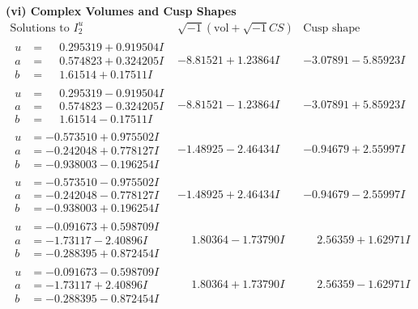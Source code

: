 \documentclass[1p]{elsarticle_modified}
\theoremstyle{definition}
\newcommand{\I}{\sqrt{-1}}
\begin{document}
\newpage\flushleft \textbf{(vi) Complex Volumes and Cusp Shapes}
$$\begin{array}{c|c|c}  
\text{Solutions to }I^u_{2}& \I (\text{vol} + \sqrt{-1}CS) & \text{Cusp shape}\\
 \hline 
\begin{aligned}
u &= \phantom{-}0.295319 + 0.919504 I \\
a &= \phantom{-}0.574823 + 0.324205 I \\
b &= \phantom{-}1.61514 + 0.17511 I\end{aligned}
 & -8.81521 + 1.23864 I & -3.07891 - 5.85923 I \\ \hline\begin{aligned}
u &= \phantom{-}0.295319 - 0.919504 I \\
a &= \phantom{-}0.574823 - 0.324205 I \\
b &= \phantom{-}1.61514 - 0.17511 I\end{aligned}
 & -8.81521 - 1.23864 I & -3.07891 + 5.85923 I \\ \hline\begin{aligned}
u &= -0.573510 + 0.975502 I \\
a &= -0.242048 + 0.778127 I \\
b &= -0.938003 - 0.196254 I\end{aligned}
 & -1.48925 - 2.46434 I & -0.94679 + 2.55997 I \\ \hline\begin{aligned}
u &= -0.573510 - 0.975502 I \\
a &= -0.242048 - 0.778127 I \\
b &= -0.938003 + 0.196254 I\end{aligned}
 & -1.48925 + 2.46434 I & -0.94679 - 2.55997 I \\ \hline\begin{aligned}
u &= -0.091673 + 0.598709 I \\
a &= -1.73117 - 2.40896 I \\
b &= -0.288395 + 0.872454 I\end{aligned}
 & \phantom{-}1.80364 - 1.73790 I & \phantom{-}2.56359 + 1.62971 I \\ \hline\begin{aligned}
u &= -0.091673 - 0.598709 I \\
a &= -1.73117 + 2.40896 I \\
b &= -0.288395 - 0.872454 I\end{aligned}
 & \phantom{-}1.80364 + 1.73790 I & \phantom{-}2.56359 - 1.62971 I \\ \hline\begin{aligned}

\end{aligned}
\end{array}$$
\end{document}
